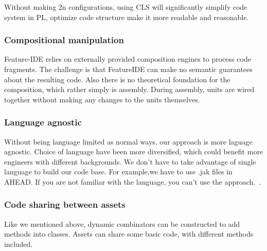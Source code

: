 Without making 2n configurations, using CLS will significantly simplify code system in PL, optimize code structure
make it more readable and reasonable.


\subsubsection{Compositional manipulation}

Feature-IDE relies on externally provided composition engines to process code fragments. The challenge
is that FeatureIDE can make no semantic guarantees about the resulting code. Also there is no theoretical
foundation for the composition, which rather simply is assembly. During assembly, units are wired together
without making any changes to the units themselves.

\subsubsection{Language agnostic}


Without being language limited as normal ways, our approach is more laguage agnostic. Choice of language have
been more diversified, which could benefit more engineers with different backgrounds. We don't have to take
advantage of single language to build our code base. For example,we have to use .jak files in AHEAD. If
you are not familiar with the language, you can't use the approach.~\cite{PEPM18}.

\subsubsection{Code sharing between assets}


Like we mentioned above, dynamic combinators can be constructed to add methods into classes. Assets can share
some basic code, with different methods included.